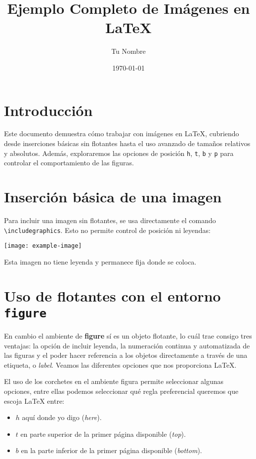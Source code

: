 \documentclass[12pt]{article}
\title{Ejemplo Completo de Imágenes en \LaTeX}
\author{Tu Nombre}
\date{\today}
\begin{document}
\maketitle

\section{Introducción}
Este documento demuestra cómo trabajar con imágenes en \LaTeX{}, cubriendo desde inserciones básicas sin flotantes hasta el uso avanzado de tamaños relativos y absolutos. Además, exploraremos las opciones de posición \texttt{h}, \texttt{t}, \texttt{b} y \texttt{p} para controlar el comportamiento de las figuras.

\section{Inserción básica de una imagen}
Para incluir una imagen sin flotantes, se usa directamente el comando \texttt{\textbackslash includegraphics}. Esto no permite control de posición ni leyendas:

\noindent
\texttt{[image: example-image]} %

Esta imagen no tiene leyenda y permanece fija donde se coloca.

\section{Uso de flotantes con el entorno \texttt{figure}}

En cambio el ambiente de \textbf{figure} sí es un objeto flotante, lo cuál trae consigo tres ventajas: la opción de incluir leyenda, la numeración continua y automatizada de las figuras y el poder hacer referencia a los objetos directamente a través de una etiqueta, o \textit{label}. 
Veamos las diferentes opciones que nos proporciona \LaTeX{}. 

El uso de los corchetes en el ambiente figura permite seleccionar algunas opciones, entre ellas podemos seleccionar qué regla preferencial queremos que escoja \LaTeX{} entre:

\begin{itemize}
\item $h$ aquí donde yo digo (\textit{here}). 
\item $t$ en parte superior de la primer página disponible (\textit{top}). 
\item $b$ en la parte inferior de la primer página disponible (\textit{bottom}). 
\end{itemize}
\end{document}
